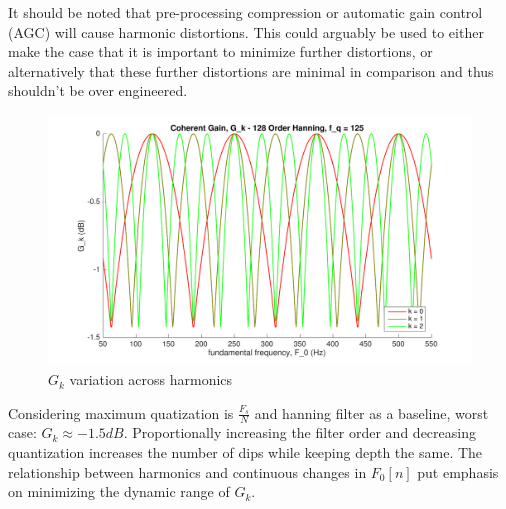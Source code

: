 \documentclass [11pt, proquest,oneside] {ganter_thesis}[2015/03/03]
\begin{document}
It should be noted that pre-processing compression or automatic gain control (AGC) will cause harmonic distortions.  This could arguably be used to either make the case that it is important to minimize further distortions, or alternatively that these further distortions are minimal in comparison and thus shouldn't be over engineered.

\begin{figure}[!ht]
  \centering
    \includegraphics[width=1\textwidth]{g_k_4}   
    \caption{$G_k$ variation across harmonics}\label{fig:g_k_4}
\end{figure}

Considering maximum quatization is $\frac{F_s}{N}$ and hanning filter as a baseline, worst case: $G_k \approx -1.5dB$.  Proportionally increasing the filter order and decreasing quantization increases the number of dips while keeping depth the same.  The relationship between harmonics and continuous changes in $F_0[n]$ put emphasis on minimizing the dynamic range of $G_k$.




\end{document}
